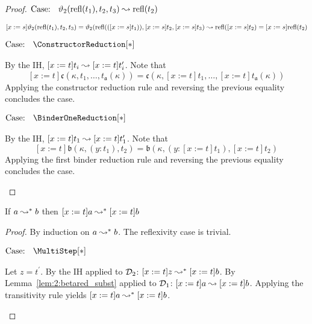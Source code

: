 \begin{proof}
    $\text{Case: }\begin{array}{c} \vartheta_2(\text{refl}(t_1), t_2, t_3) \leadsto \text{refl}(t_2) \end{array}$
    \begin{proofcase}
        $[x := s]\vartheta_2(\text{refl}(t_1), t_2, t_3) = \vartheta_2(\text{refl}(([x := s]t_1)), [x := s]t_2, [x := s]t_3) \leadsto \text{refl}([x := s]t_2) = [x := s]\text{refl}(t_2)$
    \end{proofcase}

    $\text{Case: }\begin{array}{c} \ConstructorReduction[*] \end{array}$
    \begin{proofcase}
        By the IH, $[x := t]t_i \leadsto [x := t]t_i^\prime$.
        Note that $$[x := t]\mathfrak{c}(\kappa, t_1, \ldots, t_{\mathfrak{a}}(\kappa)) = \mathfrak{c}(\kappa, [x := t]t_1, \ldots, [x := t]t_{\mathfrak{a}}(\kappa))$$
        Applying the constructor reduction rule and reversing the previous equality concludes the case.
    \end{proofcase}

    $\text{Case: }\begin{array}{c} \BinderOneReduction[*] \end{array}$
    \begin{proofcase}
        By the IH, $[x := t]t_1 \leadsto [x := t]t_1^\prime$.
        Note that $$[x := t]\mathfrak{b}(\kappa, (y : t_1), t_2) = \mathfrak{b}(\kappa, (y : [x := t]t_1), [x := t]t_2)$$
        Applying the first binder reduction rule and reversing the previous equality concludes the case.
    \end{proofcase}
\end{proof}

\begin{lemma}
    If $a \leadsto^* b$ then $[x := t]a \leadsto^* [x := t]b$
    \label{lem:2:betastar_subst_weak1}
\end{lemma}
\begin{proof}
    By induction on $a \leadsto^* b$.
    The reflexivity case is trivial.

    $\text{Case: }\begin{array}{c} \MultiStep[*] \end{array}$
    \begin{proofcase}
        Let $z = t^\prime$.
        By the IH applied to $\mathcal{D}_{2}$: $[x := t]z \leadsto^* [x := t]b$.
        By Lemma~\ref{lem:2:betared_subst} applied to $\mathcal{D}_{1}$: $[x := t]a \leadsto [x := t]b$.
        Applying the transitivity rule yields $[x := t]a \leadsto^* [x := t]b$.
    \end{proofcase}
\end{proof}

